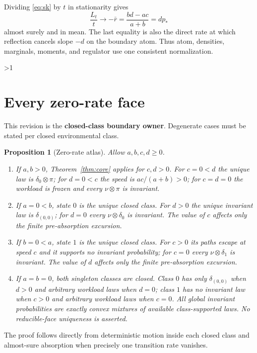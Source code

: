 \documentclass[10pt]{article}
\providecommand{\CRevisionRound}{2}
\newtheorem{proposition}{Proposition}
\begin{document}
Dividing \eqref{eq:sk} by $t$ in stationarity gives
\begin{equation}\label{eq:reg}
 \frac{L_t}{t}\longrightarrow-\bar r
 =\frac{bd-ac}{a+b}=d p_*
\end{equation}
almost surely and in mean.  The last equality is also the direct rate at which
reflection cancels slope $-d$ on the boundary atom.  Thus atom, densities,
marginals, moments, and regulator use one consistent normalization.
\fi

\ifnum\CRevisionRound>1
\section{Every zero-rate face}
This revision is the \textbf{closed-class boundary owner}.  Degenerate cases
must be stated per closed environmental class.

\begin{proposition}[Zero-rate atlas]\label{prop:faces}
Allow $a,b,c,d\ge0$.
\begin{enumerate}
\item If $a,b>0$, Theorem~\ref{thm:core} applies for $c,d>0$.  For $c=0<d$
the unique law is $\delta_0\otimes\pi$; for $d=0<c$ the speed is
$ac/(a+b)>0$; for $c=d=0$ the workload is frozen and every
$\nu\otimes\pi$ is invariant.
\item If $a=0<b$, state $0$ is the unique closed class.  For $d>0$ the unique
invariant law is $\delta_{(0,0)}$; for $d=0$ every
$\nu\otimes\delta_0$ is invariant.  The value of $c$ affects only the finite
pre-absorption excursion.
\item If $b=0<a$, state $1$ is the unique closed class.  For $c>0$ its paths
escape at speed $c$ and it supports no invariant probability; for $c=0$ every
$\nu\otimes\delta_1$ is invariant.  The value of $d$ affects only the finite
pre-absorption excursion.
\item If $a=b=0$, both singleton classes are closed.  Class $0$ has only
$\delta_{(0,0)}$ when $d>0$ and arbitrary workload laws when $d=0$; class $1$
has no invariant law when $c>0$ and arbitrary workload laws when $c=0$.
All global invariant probabilities are exactly convex mixtures of available
class-supported laws.  No reducible-face uniqueness is asserted.
\end{enumerate}
\end{proposition}

The proof follows directly from deterministic motion inside each closed class
and almost-sure absorption when precisely one transition rate vanishes.
\end{document}
